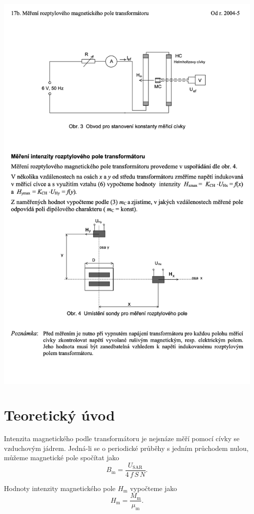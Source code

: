 \documentclass[a4paper,12pt]{article}   %
\begin{document}
\includegraphics[width=\textwidth]{5.png}
\newpage


\section{Teoretický úvod}
\label{chap:teoreticky_uvod}
Intenzita magnetického podle transformátoru je nejsnáze měří pomocí cívky se vzduchovým jádrem. Jedná-li se o periodické průběhy s jedním průchodem nulou, můžeme magnetické pole spočítat jako
\begin{equation}
  B_\text{m}=\frac{U_\text{SAR}}{4\,f\,S\,N}.
\end{equation}

Hodnoty intenzity magnetického pole $H_\text{m}$ vypočteme jako
\begin{equation}
  H_\text{m}=\frac{M_\text{m}}{\mu_\text{m}}.
\end{equation} 
\end{document}
